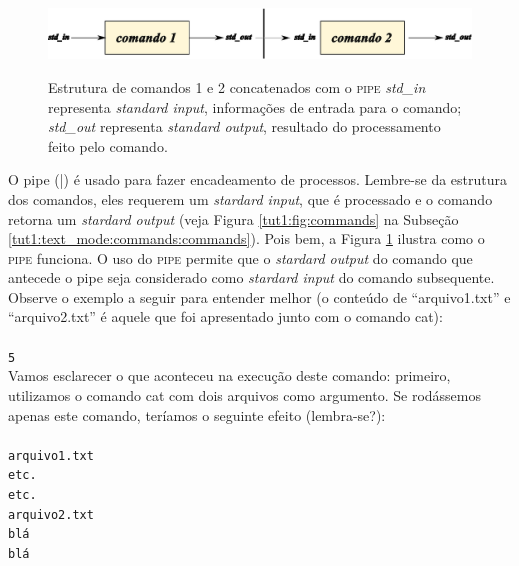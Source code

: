 \begin{refsection}
  \begin{figure}[H]
      {\includegraphics[scale=0.6]{figures/tut1/pipe.eps}}
      {\caption[\textit{Estrutura de comandos utilizando pipe}]{Estrutura de comandos 1 e 2 concatenados com o \textsc{pipe}\: \textit{std\_in} representa \textit{standard input}, informações de entrada para o comando;  \textit{std\_out} representa \textit{standard output}, resultado do processamento feito pelo comando.}\label{tut1:fig:pipe}}

  \end{figure}


O pipe (|) é usado para fazer encadeamento de processos. Lembre-se da estrutura dos comandos, eles requerem um \textit{stardard input}, que é processado e o comando retorna um \textit{stardard output} (veja Figura \ref{tut1:fig:commands} na Subseção \ref{tut1:text_mode:commands:commands}). Pois bem, a Figura \ref{tut1:fig:pipe} ilustra como o \textsc{pipe} funciona. O uso do \textsc{pipe} permite que o \textit{stardard output} do comando que antecede o pipe seja considerado como \textit{stardard input} do comando subsequente.\\
Observe o exemplo a seguir para entender melhor (o conteúdo de ``arquivo1.txt'' e ``arquivo2.txt'' é aquele que foi apresentado junto com o comando cat):\\

\\
\indent\texttt{5}\\

Vamos esclarecer o que aconteceu na execução deste comando: primeiro, utilizamos o comando cat com dois arquivos como argumento. Se rodássemos apenas este comando, teríamos o seguinte efeito (lembra-se?):\\
\\
\texttt{arquivo1.txt\\
etc.\\
etc.\\
arquivo2.txt\\
blá\\
blá\\}


\end{refsection}
